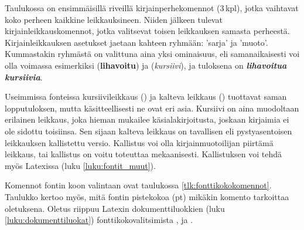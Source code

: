 Taulukossa on ensimmäisillä riveillä kirjainperhekomennot (3\,kpl),
jotka vaihtavat koko perheen kaikkine leikkauksineen. Niiden jälkeen
tulevat kirjainleikkauskomennot, jotka valitsevat toisen leikkauksen
samasta perheestä. Kirjainleikkauksen asetukset jaetaan kahteen ryhmään:
 'sarja' ja  'muoto'.
Kummastakin ryhmästä on valittuna aina yksi ominaisuus, eli
samanaikaisesti voi olla voimassa esimerkiksi 
(\textbf{lihavoitu}) ja  (\textit{kursiivi}), ja
tuloksena on \textbf{\itshape lihavoitua kursiivia}.

Useimmissa fonteissa kursiivileikkaus () ja
kalteva leikkaus () tuottavat saman
lopputuloksen, mutta käsitteellisesti ne ovat eri asia. Kursiivi on aina
muodoltaan erilainen leikkaus, joka hieman mukailee
käsi\-ala\-kir\-joi\-tusta, joskaan kirjaimia ei ole sidottu toisiinsa.
Sen sijaan kalteva leikkaus on tavallisen eli pys\-ty\-asen\-toi\-sen
leikkauksen kallistettu versio. Kallistus voi olla kirjainmuotoilijan
piirtämä leikkaus, tai kallistus on voitu toteuttaa mekaanisesti.
Kallistuksen voi tehdä myös Latexissa (luku \ref{luku:fontit_muut}).

Komennot fontin koon valintaan ovat taulukossa
\ref{tlk:fonttikokokomennot}. Taulukko kertoo myös, mitä fontin
pistekokoa (pt) mikäkin komento tarkoittaa oletuksena. Oletus riippuu
Latexin dokumenttiluokkien (luku \ref{luku:dokumenttiluokat})
fonttikokovalitsimista \koodi{10pt}, \koodi{11pt} ja \koodi{12pt}.


